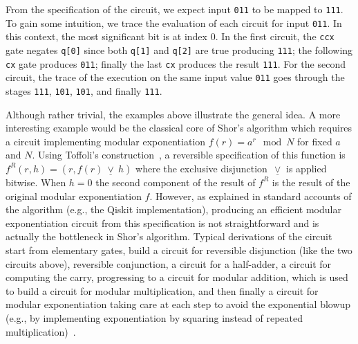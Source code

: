 From the specification of the circuit, we expect input \verb|011| to be mapped
to \verb|111|. To gain some intuition, we trace the evaluation of each circuit for
input \verb|011|. In this context, the most significant bit is at index 0. In
the first circuit, the \verb|ccx| gate negates \verb|q[0]| since both \verb|q[1]| and
\verb|q[2]| are true producing \verb|111|; the following \verb|cx| gate produces
\verb|011|; finally the last \verb|cx| produces the result \verb|111|. For the
second circuit, the trace of the execution on the same input value \verb|011| goes through the stages \verb|111|, \verb|101|, \verb|101|, and finally \verb|111|.

Although rather trivial, the examples above illustrate the general idea. A more interesting example would be the
classical core of Shor's algorithm which requires a circuit implementing modular exponentiation $f(r) = a^{r} \mod N$
for fixed $a$ and $N$. Using Toffoli's construction~\citeyearpar{Toffoli:1980}, a reversible specification of this
function is $f^R(r,h) = (r, f(r)~\underline{\vee}~ h)$ where the exclusive disjunction~$\underline{\vee}$ is applied
bitwise. When $h=0$ the second component of the result of $f^R$ is the result of the original modular exponentiation
$f$.
However, as explained in standard accounts of the algorithm (e.g., the
Qiskit implementation), producing an efficient modular exponentiation circuit
from this specification is not straightforward and is actually the bottleneck in
Shor’s algorithm. Typical derivations of the circuit start from elementary
gates, build a circuit for reversible disjunction (like the two circuits above),
reversible conjunction, a circuit for a half-adder, a circuit for computing the
carry, progressing to a circuit for modular addition, which is used to build a
circuit for modular multiplication, and then finally a circuit for modular
exponentiation taking care at each step to avoid the exponential blowup (e.g.,
by implementing exponentiation by squaring instead of repeated
multiplication)~\cite{shorefficient}.

